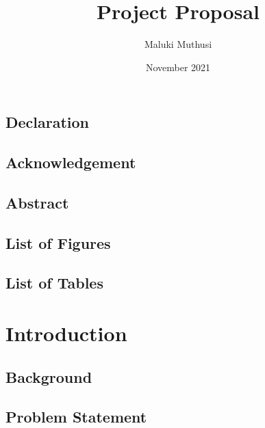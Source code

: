 \documentclass{report}
\title{Project Proposal}
\author{Maluki Muthusi}
\date{November 2021}
\begin{document}


\section{Declaration}

\newpage

\section{Acknowledgement}

\newpage

\section{Abstract}

\newpage


\renewcommand*\contentsname{\section{Table of Contents}}


\section{List of Figures}

\section{List of Tables}


\chapter{Introduction}


\section{Background}


\section{Problem Statement}

\end{document}

